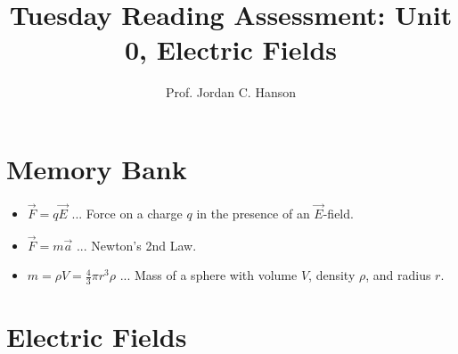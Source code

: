 \documentclass{article}
\begin{document}
\title{Tuesday Reading Assessment: Unit 0, Electric Fields}
\author{Prof. Jordan C. Hanson}

\maketitle

\section{Memory Bank}

\begin{itemize}
\item $\vec{F} = q \vec{E}$ ... Force on a charge $q$ in the presence of an $\vec{E}$-field.
\item $\vec{F} = m\vec{a}$ ... Newton's 2nd Law.
\item $m = \rho V = \frac{4}{3}\pi r^3 \rho$ ... Mass of a sphere with volume $V$, density $\rho$, and radius $r$.
\end{itemize}

\section{Electric Fields}
\end{document}
